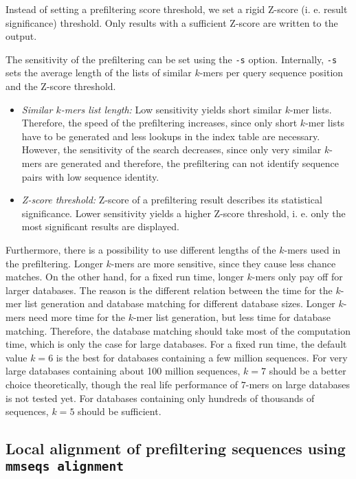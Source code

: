\documentclass[11pt,a4paper]{report}
\begin{document}
Instead of setting a prefiltering score threshold, we set a rigid
Z-score (i. e. result significance) threshold. Only results with a
sufficient Z-score are written to the output.

The sensitivity of the prefiltering can be set using the \texttt{-s}
option. Internally, \texttt{-s} sets the average length of the lists
of similar $k$-mers per query sequence position and the Z-score threshold. 
\begin{itemize}
\item \emph{Similar $k$-mers list length:} Low sensitivity yields short
similar $k$-mer lists. Therefore, the speed of the prefiltering increases,
since only short $k$-mer lists have to be generated and less lookups
in the index table are necessary. However, the sensitivity of the
search decreases, since only very similar $k$-mers are generated
and therefore, the prefiltering can not identify sequence pairs with
low sequence identity.
\item \emph{Z-score threshold:}\textbf{ }Z-score of a prefiltering result
describes its statistical significance. Lower sensitivity yields a
higher Z-score threshold, i. e. only the most significant results
are displayed.
\end{itemize}
Furthermore, there is a possibility to use different lengths of the
$k$-mers used in the prefiltering. Longer $k$-mers are more sensitive,
since they cause less chance matches. On the other hand, for a fixed
run time, longer $k$-mers only pay off for larger databases. The
reason is the different relation between the time for the $k$-mer
list generation and database matching for different database sizes.
Longer $k$-mers need more time for the $k$-mer list generation,
but less time for database matching. Therefore, the database matching
should take most of the computation time, which is only the case for
large databases. For a fixed run time, the default value $k=6$ is
the best for databases containing a few million sequences. For very
large databases containing about 100 million sequences, $k=7$ should
be a better choice theoretically, though the real life performance
of $7$-mers on large databases is not tested yet. For databases containing
only hundreds of thousands of sequences, $k=5$ should be sufficient. 


\subsection{Local alignment of prefiltering sequences using \texttt{mmseqs alignment}}
\end{document}
